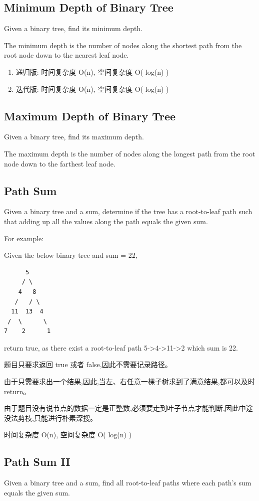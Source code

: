 \documentclass[12pt]{book}
\begin{document}
\subsection{Minimum Depth of Binary Tree}
\label{sec-4-4-1}
Given a binary tree, find its minimum depth.

The minimum depth is the number of nodes along the shortest path from the root node down to the nearest leaf node.
\begin{enumerate}
\item 递归版: 时间复杂度 O(n), 空间复杂度 O( log(n) )
\label{sec-4-4-1-1}
\item 迭代版: 时间复杂度 O(n), 空间复杂度 O( log(n) )
\label{sec-4-4-1-2}
\end{enumerate}

\subsection{Maximum Depth of Binary Tree}
\label{sec-4-4-2}
Given a binary tree, find its maximum depth.

The maximum depth is the number of nodes along the longest path from the root node down to the farthest leaf node.

\subsection{Path Sum}
\label{sec-4-4-3}
Given a binary tree and a sum, determine if the tree has a root-to-leaf path such that adding up all the values along the path equals the given sum.

For example:

Given the below binary tree and sum = 22,
\lstset{language=java,label= ,caption= ,numbers=none}
\begin{lstlisting}
      5
     / \
    4   8
   /   / \
  11  13  4
 /  \      \
7    2      1
\end{lstlisting}

return true, as there exist a root-to-leaf path 5->4->11->2 which sum is 22.

题目只要求返回 true 或者 false,因此不需要记录路径。

由于只需要求出一个结果,因此,当左、右任意一棵子树求到了满意结果,都可以及时 return。

由于题目没有说节点的数据一定是正整数,必须要走到叶子节点才能判断,因此中途没法剪枝,只能进行朴素深搜。

时间复杂度 O(n), 空间复杂度 O( log(n) )

\subsection{Path Sum II}
\label{sec-4-4-4}
Given a binary tree and a sum, find all root-to-leaf paths where each path's sum equals the given sum.
\end{document}
